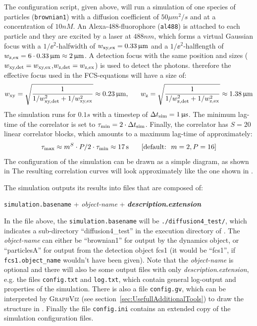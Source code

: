 The  configuration script, given above, will run a simulation of one species of particles (\texttt{brownian1}) with a diffusion coefficient of $50\unit{\mu m^2/s}$ and at a concentration of $10\unit{nM}$. An Alexa-488-fluorophore (\texttt{al488}) is attached to each particle and they are excited by a laser at $488\unit{nm}$, which forms a virtual Gaussian focus with a $1/\ee^2$-halfwidth of $w_\txt{xy,ex}=0.33\unit{\mu m}$ and a $1/\ee^2$-halflength of $w_\txt{z,ex}=6\cdot0.33\unit{\mu m}\approx2\unit{\mu m}$. A detection focus with the same position and sizes ($w_{\text{xy,det}}=w_{\text{xy,ex}}$,$w_{\text{z,det}}=w_{\text{z,ex}}$) is used to detect the photons. therefore the effective focus used in the FCS-equations will have a size of:
  \[ w_\txt{xy}=\sqrt{\frac{1}{1/w_\txt{xy,det}^2+1/w_\txt{xy,ex}^2}}\approx0.23\unit{\mu m},\ \ \ \ \ w_\txt{z}=\sqrt{\frac{1}{1/w_\txt{z,det}^2+1/w_\txt{z,ex}^2}}\approx1.38\unit{\mu m} \]
The simulation runs for $0.1\unit{s}$ with a timestep of $\Delta t_\txt{sim}=1\unit{\mu s}$. The minimum lag-time of the correlator is set to $\tau_{\text{min}}=2\cdot\Delta t_{\text{sim}}$. Finally, the correlator has $S=20$ linear correlator blocks, which amounts to a maximum lag-time of approximately:
  \[ \tau_\txt{max}\approx m^S\cdot P/2\cdot\tau_\txt{min}\approx17\unit{s}\ \ \ \ \ \left[\text{default:}\ \ m=2, P=16\right] \]
The configuration of the simulation can be drawn as a simple diagram, as shown in 
The resulting correlation curves will look approximately like the one shown in .

The simulation outputs its results into files that are composed of:
\begin{center}
	\texttt{simulation.basename} + \textit{object-name} + \textbf{\textit{description}.\textit{extension}}
\end{center}
In the file above, the \texttt{simulation.basename} will be \texttt{./diffusion4\_test/}, which indicates a sub-directory  ``diffusion4\_test'' in the execution directory of \df. The \textit{object-name} can either be ``brownian1'' for output by the dynamics object, or ``particlesA'' for output from the detection object fcs1 (it would be ``fcs1'', if \texttt{fcs1.object\_name} wouldn't have been given). Note that the \textit{object-name} is optional and there will also be some output files with only \textit{description}.\textit{extension}, e.g. the files \texttt{config.txt} and \texttt{log.txt}, which contain general log-output and properties of the simulation. There is also a file \texttt{config.gv}, which can be interpreted by \textsc{GraphViz} (see section~\ref{sec:UsefullAdditionalTools}) to draw the structure in . Finally the file \texttt{config.ini} contains an extended copy of the simulation configuration files.


